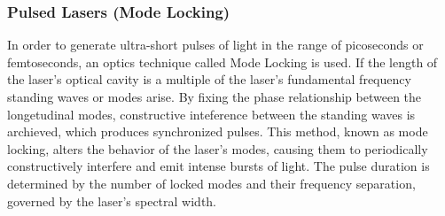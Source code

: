 \subsubsection{Pulsed Lasers (Mode Locking)}
    In order to generate ultra-short pulses of light in the range of picoseconds or femtoseconds, an optics technique called Mode Locking is used.
    If the length of the laser's optical cavity is a multiple of the laser's fundamental frequency standing waves or modes arise. 
    By fixing the phase relationship between the longetudinal modes, constructive inteference between the standing waves is archieved, which produces synchronized pulses.   
    This method, known as mode locking, alters the behavior of the laser's modes, causing them to periodically constructively interfere and emit intense bursts of light. 
    The pulse duration is determined by the number of locked modes and their frequency separation, governed by the laser's spectral width. 

    
